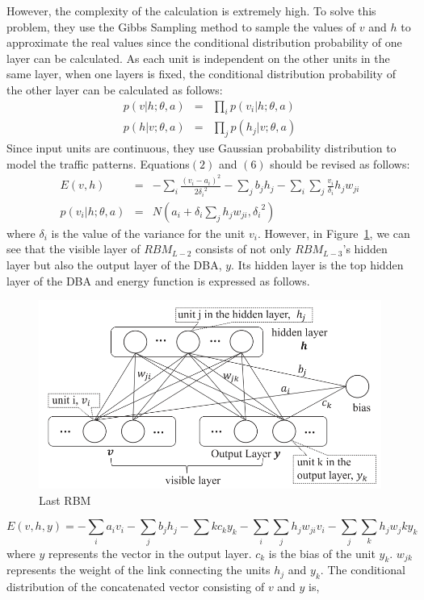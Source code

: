 \documentclass[11pt]{report}
\begin{document}
	However, the complexity of the calculation is extremely high. To solve this problem, they use the Gibbs Sampling method to sample the values of $v$ and $h$ to approximate the real values since the conditional distribution probability of one layer can be calculated. As each unit is independent on the other units in the same layer, when one layers is fixed, the conditional distribution probability of the other layer can be calculated as follows:
	\begin{eqnarray}
	p\left(v|h;\theta,a\right) &=& \prod_{i}p\left(v_i|h;\theta,a\right)\\
	p\left(h|v;\theta,a\right) &=& \prod_{j}p\left(h_j|v;\theta,a\right)
	\end{eqnarray}
	Since input units are continuous, they use Gaussian probability distribution to model the traffic patterns. Equations$\left(2\right)$ and $\left(6\right)$ should be revised as follows:
	\begin{eqnarray}
	E\left(v,h\right) &=& -\sum_{i}\frac{\left(v_i-a_i\right)^2}{2{\delta_i}^2}-\sum_{j}b_jh_j-\sum_{i}\sum_{j}\frac{v_i}{\delta_i}h_jw_{ji}\\
	p\left(v_i|h;\theta,a\right) &=& N\left(a_i+\delta_i\sum_{j}h_jw_{ji},{\delta_i}^2\right)	
	\end{eqnarray}
	where $\delta_i$ is the value of the variance for the unit $v_i$. 
	However, in Figure~\ref{3rdfig}, we can see that the visible layer of $RBM_{L-2}$ consists of not only $RBM_{L-3}$'s hidden layer but also the output layer of the DBA, $y$. Its hidden layer is the top hidden layer of the DBA and energy function is expressed as follows.
	\begin{figure}[h!]
		\centering
		\includegraphics[width=0.5\linewidth]{figure3.png}
		\caption{Last RBM}
		\label{3rdfig}
	\end{figure}
	\begin{equation}
	E\left(v,h,y\right) = -\sum_{i}a_iv_i-\sum_{j}b_jh_j-\sum{k}c_ky_k-\sum_{i}\sum_{j}h_jw_{ji}v_i-\sum_{j}\sum_{k}h_jw_jky_k
	\end{equation}
	where $y$ represents the vector in the output layer. $c_k$ is the bias of the unit $y_k$. $w_{jk}$ represents the weight of the link connecting the units $h_j$ and $y_k$. The conditional distribution of the concatenated vector consisting of $v$ and $y$ is,
\end{document}
